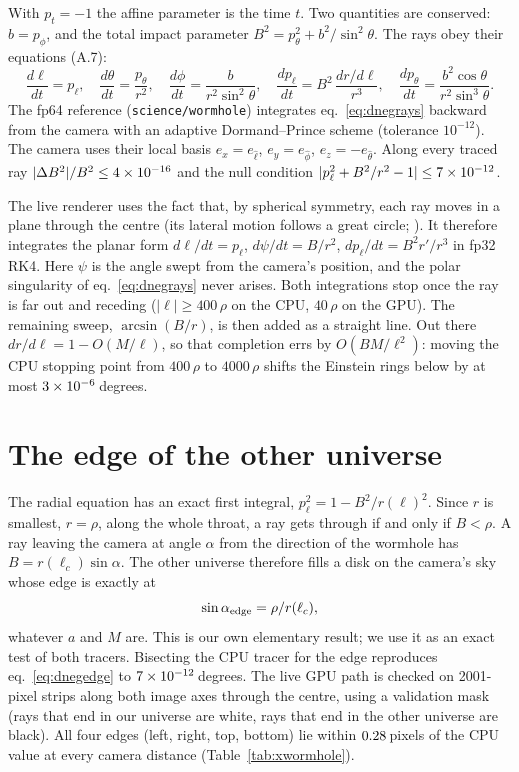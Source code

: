 With $p_t = -1$ the affine parameter is the time $t$. Two quantities are
conserved: $b = p_\phi$, and the total impact parameter $B^2 = p_\theta^2 +
b^2/\sin^2\theta$. The rays obey their equations (A.7):
\begin{equation}
\frac{d\ell}{dt} = p_\ell, \quad
\frac{d\theta}{dt} = \frac{p_\theta}{r^2}, \quad
\frac{d\phi}{dt} = \frac{b}{r^2\sin^2\theta}, \quad
\frac{dp_\ell}{dt} = B^2\,\frac{dr/d\ell}{r^3}, \quad
\frac{dp_\theta}{dt} = \frac{b^2\cos\theta}{r^2\sin^3\theta} .
\label{eq:dnegrays}
\end{equation}
The fp64 reference (\texttt{science/wormhole}) integrates
eq.~\eqref{eq:dnegrays} backward from the camera with an adaptive
Dormand--Prince scheme (tolerance $10^{-12}$). The camera uses their local
basis $e_x = e_{\hat\ell}$, $e_y = e_{\hat\phi}$, $e_z = -e_{\hat\theta}$. Along
every traced ray $|\Delta B^2|/B^2 \le 4\times10^{-16}$ and the null condition
$|p_\ell^2 + B^2/r^2 - 1| \le 7\times10^{-12}$.

The live renderer uses the fact that, by spherical symmetry, each ray moves in
a plane through the centre (its lateral motion follows a great circle;
\citealp{James2015wormhole}). It therefore integrates the planar form
$d\ell/dt = p_\ell$, $d\psi/dt = B/r^2$, $dp_\ell/dt = B^2 r'/r^3$ in fp32 RK4.
Here $\psi$ is the angle swept from the camera's position, and the polar
singularity of eq.~\eqref{eq:dnegrays} never arises. Both integrations stop
once the ray is far out and receding ($|\ell| \ge 400\,\rho$ on the CPU,
$40\,\rho$ on the GPU). The remaining sweep, $\arcsin(B/r)$, is then added as
a straight line. Out there $dr/d\ell = 1 - O(M/\ell)$, so that completion errs
by $O(BM/\ell^2)$: moving the CPU stopping point from $400\,\rho$ to
$4000\,\rho$ shifts the Einstein rings below by at most
$3\times10^{-6}$\,degrees.

\section{The edge of the other universe}

The radial equation has an exact first integral, $p_\ell^2 = 1 - B^2/r(\ell)^2$.
Since $r$ is smallest, $r = \rho$, along the whole throat, a ray gets through
if and only if $B < \rho$. A ray leaving the camera at angle $\alpha$ from the
direction of the wormhole has $B = r(\ell_c)\sin\alpha$. The other universe
therefore fills a disk on the camera's sky whose edge is exactly at
\begin{equation}
\sin\alpha_{\rm edge} = \rho / r(\ell_c),
\label{eq:dnegedge}
\end{equation}
whatever $a$ and $M$ are. This is our own elementary result; we use it as an
exact test of both tracers. Bisecting the CPU tracer for the edge reproduces
eq.~\eqref{eq:dnegedge} to $7\times10^{-12}$\,degrees. The live GPU path is checked
on 2001-pixel strips along both image axes through the centre, using a
validation mask (rays that end in our universe are white, rays that end in the
other universe are black). All four edges (left, right, top, bottom) lie within
$0.28$\,pixels of the CPU value at every camera distance
(Table~\ref{tab:xwormhole}).

